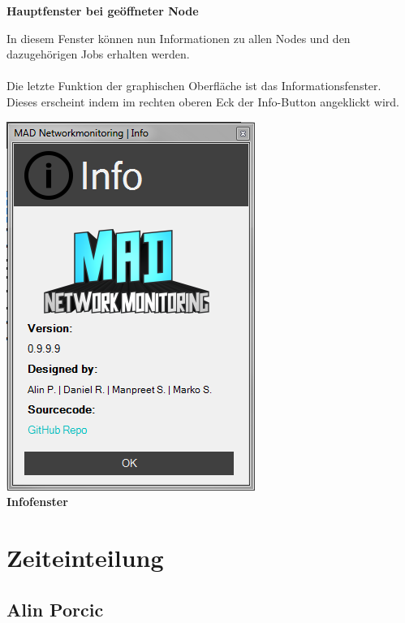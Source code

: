 \documentclass[12pt,a4paper]{report}
\begin{document}
\begin{onehalfspace}
\begin{center}
\textbf{Hauptfenster bei geöffneter Node}
\end{center}
In diesem Fenster können nun Informationen zu allen Nodes und den dazugehörigen Jobs erhalten werden.\\\\
Die letzte Funktion der graphischen Oberfläche ist das Informationsfenster. Dieses erscheint indem im rechten oberen Eck der Info-Button angeklickt wird.
\begin{center}
\includegraphics[scale=0.6]{../docs/lyaton/graphics/GUI_v3_info.png}\\
\textbf{Infofenster}
\end{center}
\part{Zeiteinteilung}

\chapter{Alin Porcic}
\begin{center}
\begin{tabular}{|l|c|l|}


\end{tabular}
\end{center}
\end{onehalfspace}
\end{document}

